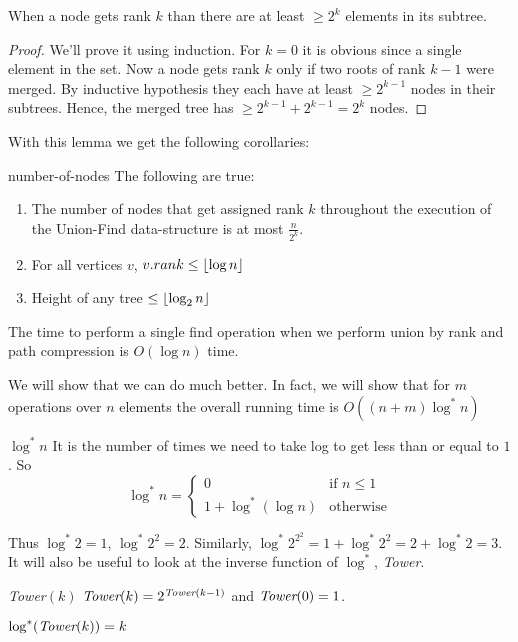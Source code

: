 \begin{lemma}{}{}
	When a node gets rank $k$ than there are at least $\geq 2^k$ elements in its subtree.
\end{lemma}
\begin{proof}
	We'll prove it using induction. For $k=0$ it is obvious since a single element in the set. Now a node gets rank $k$ only if two roots of rank $k-1$ were merged. By inductive hypothesis they each have at least $\geq 2^{k-1}$ nodes in their subtrees. Hence, the merged tree has $\geq 2^{k-1}+2^{k-1}=2^{k}$ nodes.
\end{proof}
With this lemma we get the following corollaries:
\begin{corolary}{}{number-of-nodes}
	The following are true:
	\begin{enumerate}
		\item The number of nodes that get assigned rank $k$ throughout the execution of the Union-Find data-structure is at most $\frac{n}{2^k}$.
		\item For all vertices $v$, $v.rank\leq \left\lfloor \log n\right\rfloor$
		\item Height of any tree $\leq \left\lfloor\log _2n\right\rfloor$
	\end{enumerate}
\end{corolary}
\begin{lemma}{}{}
	The time to perform a single find operation when we perform union by rank and path
	compression is $O(\log n)$ time.
\end{lemma}
We will show that we can do much better. In fact, we will show that for $m$ operations over $n$ elements the overall running time is $O((n+m)\log ^*n)$
\begin{Definition}{$\log^* n$}{}
	It is the number of times we need to take log to get less than or equal to $1$. So $$\log^*n=\begin{cases}
			0                & \text{if $n\leq 1$} \\
			1+\log^*(\log n) & \text{otherwise}
		\end{cases}$$
\end{Definition}\parinf Thus $\log^*2=1$, $\log^*2^2=2$. Similarly,  $\log^*2^{2^{2}}=1+\log^*2^2=2+\log^*2=3$. It will also be useful to look at the inverse function of $\log^*$, \emph{Tower}.
\begin{Definition}{\emph{Tower}$(k)$}{}
	$\emph{Tower}(k)=2^{\emph{Tower}(k-1)}$ and $\emph{Tower}(0)=1$.
\end{Definition}\parinn

\begin{observation}
	$\log^*(\emph{Tower}(k))=k$
\end{observation}

